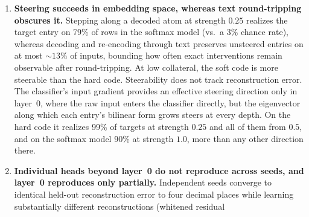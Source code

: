 \begin{enumerate}
by conditioning each stage on the sample's remaining residual error
(rather than by utilization, input conditioning, or the scalar gain
side-channel, though deep supervision on prefixes has not yet been
ablated separately). Conversely, a step along a target entry's decoded atom
flips 66\% of unrelated heads in the five-layer stack vs.\ 33\% in the
single-layer model, and realizes its target entry on only 37\% of rows vs.\
99.6\%. Along the target entry's exciting eigenvector the stack realizes 99\%
of targets at the same strength, at the same collateral, so depth costs
selectivity rather than reach. In both models, off-target collateral matches
that of a norm-matched random step because hard-code classifiers sit close to
their decision boundaries. Moreover, at matched head contribution size, stacked heads
show several-fold lower cross-seed reproducibility than single-layer
heads across every layer, including layer~0. Although the single-layer
softmax variant \texttt{g160softmax} matches the reference checkpoint
\texttt{resid\_nc} in reconstruction, a configuration-matched softmax
categorical dictionary achieves $6\times$ lower error both on
out-of-sample rows that no model saw during training and on the
evaluation tail, indicating that \texttt{resid\_nc}'s lack of a depth
advantage was checkpoint-specific.
\item \textbf{Steering succeeds in embedding space, whereas text
round-tripping obscures it.} Stepping along a decoded atom at strength
$0.25$ realizes the target entry on 79\% of rows in the softmax model
(vs.\ a 3\% chance rate), whereas decoding and re-encoding through text
preserves unsteered entries on at most ${\sim}13\%$ of inputs, bounding
how often exact interventions remain observable after round-tripping. At
low collateral, the soft code is more steerable than the hard code.
Steerability does not track reconstruction error. The classifier's input
gradient provides an effective steering direction only in layer~0, where
the raw input enters the classifier directly, but the eigenvector along
which each entry's bilinear form grows steers at every depth. On the hard
code it realizes 99\% of targets at strength $0.25$ and all of them from
$0.5$, and on the softmax model 90\% at strength $1.0$, more than any other
direction there.
\item \textbf{Individual heads beyond layer~0 do not reproduce across
seeds, and layer~0 reproduces only partially.} Independent seeds converge
to identical held-out reconstruction error to four decimal places while
learning substantially different reconstructions (whitened residual

\end{enumerate}

